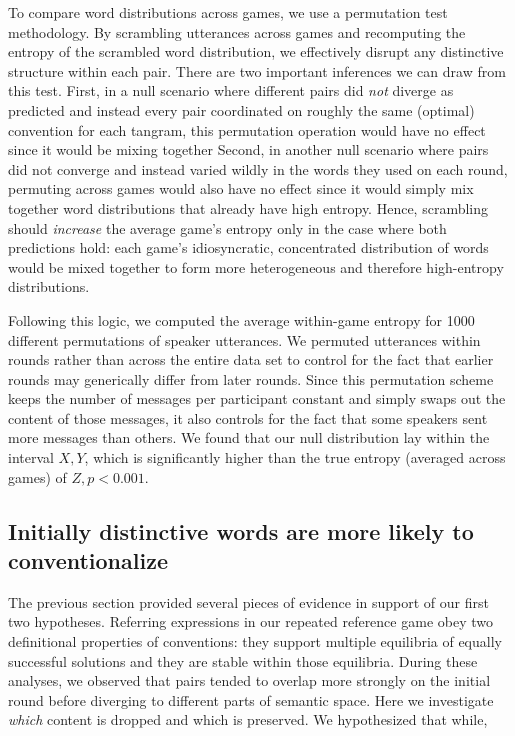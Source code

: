 To compare word distributions across games, we use a permutation test methodology.
By scrambling utterances across games and recomputing the entropy of the scrambled word distribution, we effectively disrupt any distinctive structure within each pair.
There are two important inferences we can draw from this test.
First, in a null scenario where different pairs did \emph{not} diverge as predicted and instead every pair coordinated on roughly the same (optimal) convention for each tangram, this permutation operation would have no effect since it would be mixing together 
Second, in another null scenario where pairs did not converge and instead varied wildly in the words they used on each round, permuting across games would also have no effect since it would simply mix together word distributions that already have high entropy.
Hence, scrambling should \emph{increase} the average game's entropy only in the case where both predictions hold: each game's idiosyncratic, concentrated distribution of words would be mixed together to form more heterogeneous and therefore high-entropy distributions.

Following this logic, we computed the average within-game entropy for 1000 different permutations of speaker utterances. 
We permuted utterances within rounds rather than across the entire data set to control for the fact that earlier rounds may generically differ from later rounds. 
Since this permutation scheme keeps the number of messages per participant constant and simply swaps out the content of those messages, it also controls for the fact that some speakers sent more messages than others. 
We found that our null distribution lay within the interval $X, Y$, which is significantly higher than the true entropy (averaged across games) of $Z, p < 0.001$.

\subsection{Initially distinctive words are more likely to conventionalize}
\label{sec:distinctive}

The previous section provided several pieces of evidence in support of our first two hypotheses. 
Referring expressions in our repeated reference game obey two definitional properties of conventions: they support multiple equilibria of equally successful solutions and they are stable within those equilibria.
During these analyses, we observed that pairs tended to overlap more strongly on the initial round before diverging to different parts of semantic space.
Here we investigate \emph{which} content is dropped and which is preserved.
We hypothesized that while, 

